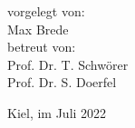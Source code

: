 \begin{titlepage}
\begin{center}
	\begin{spacing}{2.0}
	{\Large vorgelegt von:}\\
	{\Large Max Brede}\\\vspace*{1.5cm}
	{\Large betreut von:}\\
	{\Large Prof. Dr. T. Schwörer}\\
	{\Large Prof. Dr. S. Doerfel}
	\\\vspace*{1.5cm}
	\end{spacing}
	\vfill
	\begin{spacing}{0.9}
	{\Large Kiel, im Juli 2022}
	\end{spacing}
	\end{center}
\restoregeometry
\end{titlepage}
\newpage
\thispagestyle{empty}
\mbox{}
\newpage
